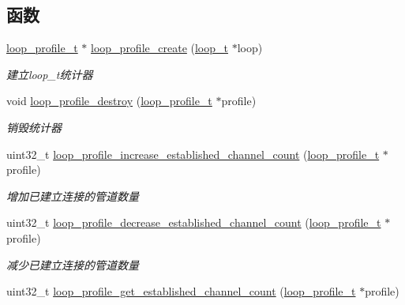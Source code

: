 \subsection*{函数}
\begin{DoxyCompactItemize}
\item 
\hyperlink{a00051_ad060e1396346d2f5db1ec0597376a107_ad060e1396346d2f5db1ec0597376a107}{loop\+\_\+profile\+\_\+t} $\ast$ \hyperlink{a00078_adb276ec4e5559b1e167dc9045fa499bb_adb276ec4e5559b1e167dc9045fa499bb}{loop\+\_\+profile\+\_\+create} (\hyperlink{a00051_a9c3ad1cd2de83e09f3a7b59fa82c94ee_a9c3ad1cd2de83e09f3a7b59fa82c94ee}{loop\+\_\+t} $\ast$loop)
\begin{DoxyCompactList}\small\item\em 建立loop\+\_\+t统计器 \end{DoxyCompactList}\item 
void \hyperlink{a00078_a737f9f904afe15e70f56886c44372e5d_a737f9f904afe15e70f56886c44372e5d}{loop\+\_\+profile\+\_\+destroy} (\hyperlink{a00051_ad060e1396346d2f5db1ec0597376a107_ad060e1396346d2f5db1ec0597376a107}{loop\+\_\+profile\+\_\+t} $\ast$profile)
\begin{DoxyCompactList}\small\item\em 销毁统计器 \end{DoxyCompactList}\item 
uint32\+\_\+t \hyperlink{a00078_af388f071a9558df8049c51205d33361a_af388f071a9558df8049c51205d33361a}{loop\+\_\+profile\+\_\+increase\+\_\+established\+\_\+channel\+\_\+count} (\hyperlink{a00051_ad060e1396346d2f5db1ec0597376a107_ad060e1396346d2f5db1ec0597376a107}{loop\+\_\+profile\+\_\+t} $\ast$profile)
\begin{DoxyCompactList}\small\item\em 增加已建立连接的管道数量 \end{DoxyCompactList}\item 
uint32\+\_\+t \hyperlink{a00078_a7cfc0ba3d4b5083413f330b519e38eec_a7cfc0ba3d4b5083413f330b519e38eec}{loop\+\_\+profile\+\_\+decrease\+\_\+established\+\_\+channel\+\_\+count} (\hyperlink{a00051_ad060e1396346d2f5db1ec0597376a107_ad060e1396346d2f5db1ec0597376a107}{loop\+\_\+profile\+\_\+t} $\ast$profile)
\begin{DoxyCompactList}\small\item\em 减少已建立连接的管道数量 \end{DoxyCompactList}\item 
uint32\+\_\+t \hyperlink{a00078_a45226aca5f27c8d49cc7b405409fc958_a45226aca5f27c8d49cc7b405409fc958}{loop\+\_\+profile\+\_\+get\+\_\+established\+\_\+channel\+\_\+count} (\hyperlink{a00051_ad060e1396346d2f5db1ec0597376a107_ad060e1396346d2f5db1ec0597376a107}{loop\+\_\+profile\+\_\+t} $\ast$profile)

\end{DoxyCompactItemize}
